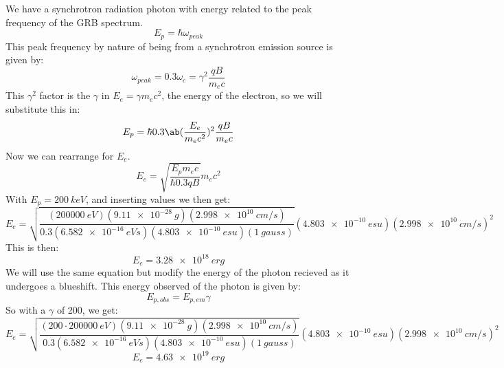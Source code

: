 We have a synchrotron radiation photon with energy related to the peak frequency of the GRB spectrum.
\begin{equation}
    E_p = \hbar \omega_{peak}
\end{equation}
This peak frequency by nature of being from a synchrotron emission source is given by:
\begin{equation}
    \omega_{peak} = 0.3\omega_c = \gamma^2 \frac{qB}{m_e c}
\end{equation}
This $\gamma^2$ factor is the $\gamma$ in $E_e = \gamma m_e c^2$, the energy of the electron, so we will substitute this in:
\begin{equation}
    E_p = \hbar 0.3\ab(\frac{E_e}{m_e c^2})^2\frac{qB}{m_e c}
\end{equation}
Now we can rearrange for $E_e$.
\begin{equation}
    E_e = \sqrt{\frac{E_p m_e c}{\hbar 0.3 qB}} m_e c^2
\end{equation}
With $E_p = \qty{200}{keV}$, and inserting values we then get:
\begin{equation}
    E_e = \sqrt{\frac{(\qty{200 000}{eV}) (\qty{9.11e-28}{g}) (\qty{2.998e10}{cm/s})}{0.3(\qty{6.582e-16}{eV s})(\qty{4.803e-10}{esu})(\qty{1}{gauss})}} (\qty{4.803e-10}{esu}) (\qty{2.998e10}{cm/s})^2
\end{equation}
This is then:
\begin{equation}
    \boxed{E_e = \qty{3.28e18}{erg}}
\end{equation}
We will use the same equation but modify the energy of the photon recieved as it undergoes a blueshift. This energy observed of the photon is given by:
\begin{equation}
    E_{p,obs} = E_{p,em} \gamma
\end{equation}
So with a $\gamma$ of 200, we get:
\begin{equation}
    E_e = \sqrt{\frac{(200\cdot\qty{200 000}{eV}) (\qty{9.11e-28}{g}) (\qty{2.998e10}{cm/s})}{0.3(\qty{6.582e-16}{eV s})(\qty{4.803e-10}{esu})(\qty{1}{gauss})}} (\qty{4.803e-10}{esu}) (\qty{2.998e10}{cm/s})^2
\end{equation}
\begin{equation}
    \boxed{E_e = \qty{4.63e19}{erg}}
\end{equation}